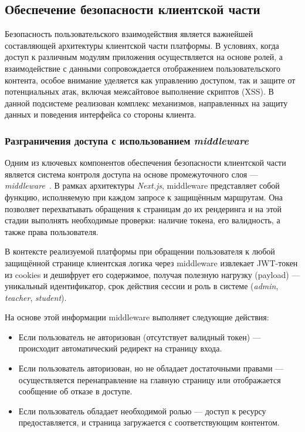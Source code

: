 \subsection{Обеспечение безопасности клиентской части}

Безопасность пользовательского взаимодействия является важнейшей составляющей архитектуры клиентской части платформы. В условиях, когда доступ к различным модулям приложения осуществляется на основе ролей, а взаимодействие с данными сопровождается отображением пользовательского контента, особое внимание уделяется как управлению доступом, так и защите от потенциальных атак, включая межсайтовое выполнение скриптов (XSS). В данной подсистеме реализован комплекс механизмов, направленных на защиту данных и поведения интерфейса со стороны клиента.

\subsubsection{Разграничения доступа с использованием \textit{middleware}}
Одним из ключевых компонентов обеспечения безопасности клиентской части является система контроля доступа на основе промежуточного слоя — \textit{middleware}~\cite{nextjs_middleware}. В рамках архитектуры \textit{Next.js}, middleware представляет собой функцию, исполняемую при каждом запросе к защищённым маршрутам. Она позволяет перехватывать обращения к страницам до их рендеринга и на этой стадии выполнять необходимые проверки: наличие токена, его валидность, а также права пользователя.

В контексте реализуемой платформы при обращении пользователя к любой защищённой странице клиентская логика через middleware извлекает JWT-токен из cookies и дешифрует его содержимое, получая полезную нагрузку (payload) — уникальный идентификатор, срок действия сессии и роль в системе (\textit{admin}, \textit{teacher}, \textit{student}).

На основе этой информации middleware выполняет следующие действия:
\begin{itemize}
  \item Если пользователь не авторизован (отсутствует валидный токен) — происходит автоматический редирект на страницу входа.
  \item Если пользователь авторизован, но не обладает достаточными правами — осуществляется перенаправление на главную страницу или отображается сообщение об отказе в доступе.
  \item Если пользователь обладает необходимой ролью — доступ к ресурсу предоставляется, и страница загружается с соответствующим контентом.
\end{itemize}

